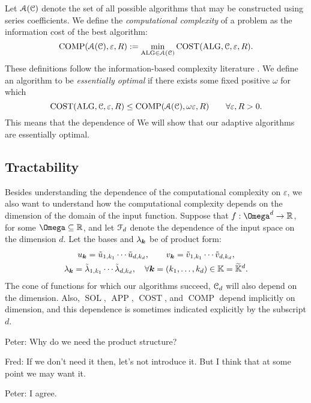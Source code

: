 \documentclass[USenglish]{article}
\DeclareMathOperator{\SOL}{SOL}
\DeclareMathOperator{\APP}{APP}
\DeclareMathOperator{\ALG}{ALG}
\DeclareMathOperator{\COST}{COST}
\DeclareMathOperator{\COMP}{COMP}
\newcommand{\tu}{\Tilde{u}}
\newcommand{\tv}{\Tilde{v}}
\newcommand{\tlambda}{\Tilde{\lambda}}
\newcommand{\tbbK}{\widetilde{\bbK}}
\newcommand{\FredNote}[1]{{\color{blue}Fred: #1}}
\newcommand{\PeterNote}[1]{{\color{orange}Peter: #1}}
\begin{document}
Let ${\mathcal{A}}({\mathcal{C}})$ denote the set of all possible algorithms that may be constructed using series coefficients.  We define the \emph{computational complexity} of a problem as the information cost of the best algorithm:
\begin{equation*}
    \COMP(\calA(\calC), \varepsilon,R) := \min_{\ALG \in \calA(\calC)} \COST(\ALG, \calC, \varepsilon,R) .
\end{equation*}
These definitions follow the information-based complexity literature \cite{TraWer98, TraWasWoz88}.
We define an algorithm to be \emph{essentially optimal} if there exists some fixed positive $\omega$ for which
\begin{equation*}
    \COST(\ALG, \calC, \varepsilon,R) \le \COMP(\calA(\calC), \omega \varepsilon,R) \qquad \forall \varepsilon,R > 0.
\end{equation*}
This means that the dependence of 
We will show that our adaptive algorithms are essentially optimal.

\subsection{Tractability}
Besides understanding the dependence of the computational complexity on $\varepsilon$, we also want to understand how the computational complexity depends on the dimension of the domain of the input function.  Suppose that $f: \Omega^d \to \R$, for some $\Omega \subseteq \R$, and let ${\mathcal{F}}_d$ denote the dependence of the input space on the dimension $d$.  Let the bases and $\lambda_{{\boldsymbol{k}}}$ be of product form:
\begin{gather*}
    u_{\bsk} = \tu_{1,k_1} \cdots \tu_{d,k_d}, \qquad  v_{\bsk} = \tv_{1,k_1} \cdots \tv_{d,k_d}, \\ 
    \lambda_{\bsk} = \tlambda_{1,k_1} \cdots \tlambda_{d,k_d}, \quad \forall \bsk = (k_1, \ldots, k_d) \in \bbK = \tbbK^d.
\end{gather*}
The cone of functions for which our algorithms succeed, ${\mathcal{C}}_d$ will also depend on the dimension.  Also, $\SOL$, $\APP$, $\COST$, and $\COMP$ depend implicitly on dimension, and this dependence is sometimes indicated explicitly by the subscript $d$.

\PeterNote{Why do we need the product structure?}

\FredNote{If we don't need it then, let's not introduce it.  But I think that at some point we may want it.}

\PeterNote{I agree.}
\end{document}
